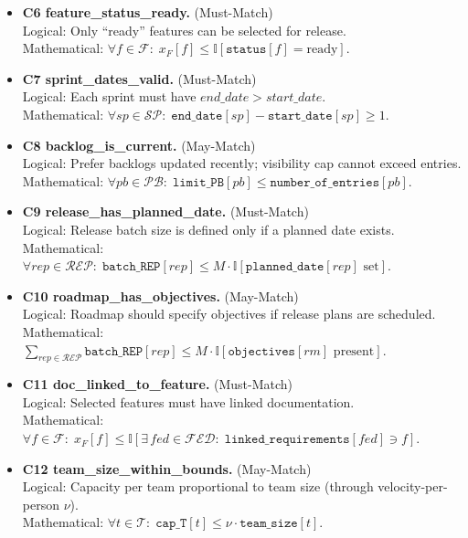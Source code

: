 \documentclass[11pt,a4paper]{article}
\begin{document}
\begin{itemize}[leftmargin=2em]
  \item \textbf{C6 \; feature\_status\_ready.} (Must-Match)\\
  Logical: Only ``ready'' features can be selected for release.\\
  Mathematical:\; $\forall f \in \mathcal{F}:\; x_F[f] \le \mathbb{I}[\texttt{status}[f]=\text{ready}]$.

  \item \textbf{C7 \; sprint\_dates\_valid.} (Must-Match)\\
  Logical: Each sprint must have $end\_date > start\_date$.\\
  Mathematical:\; $\forall sp \in \mathcal{SP}:\; \texttt{end\_date}[sp] - \texttt{start\_date}[sp] \ge 1$.

  \item \textbf{C8 \; backlog\_is\_current.} (May-Match)\\
  Logical: Prefer backlogs updated recently; visibility cap cannot exceed entries.\\
  Mathematical:\; $\forall pb \in \mathcal{PB}:\; \texttt{limit\_PB}[pb] \le \texttt{number\_of\_entries}[pb]$.

  \item \textbf{C9 \; release\_has\_planned\_date.} (Must-Match)\\
  Logical: Release batch size is defined only if a planned date exists.\\
  Mathematical:\; $\forall rep \in \mathcal{REP}:\; \texttt{batch\_REP}[rep] \le M \cdot \mathbb{I}[\texttt{planned\_date}[rep]\text{ set}]$.

  \item \textbf{C10 \; roadmap\_has\_objectives.} (May-Match)\\
  Logical: Roadmap should specify objectives if release plans are scheduled.\\
  Mathematical:\; $\sum_{rep \in \mathcal{REP}} \texttt{batch\_REP}[rep] \le M \cdot \mathbb{I}[\texttt{objectives}[rm]\text{ present}]$.

  \item \textbf{C11 \; doc\_linked\_to\_feature.} (Must-Match)\\
  Logical: Selected features must have linked documentation.\\
  Mathematical:\; $\forall f \in \mathcal{F}:\; x_F[f] \le \mathbb{I}[\exists\, fed \in \mathcal{FED}:\; \texttt{linked\_requirements}[fed]\ni f]$.

  \item \textbf{C12 \; team\_size\_within\_bounds.} (May-Match)\\
  Logical: Capacity per team proportional to team size (through velocity-per-person $\nu$).\\
  Mathematical:\; $\forall t \in \mathcal{T}:\; \texttt{cap\_T}[t] \le \nu \cdot \texttt{team\_size}[t]$.
\end{itemize}
\end{document}

